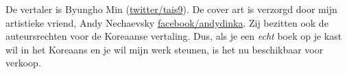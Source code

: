 \iffalse
\begin{figure}[H]
\centering
\texttt{[image: acorn\_cover.jpg]}
\end{figure}
\fi

De vertaler is Byungho Min (\href{http://go.yurichev.com/17344}{twitter/tais9}).
De cover art is verzorgd door mijn artistieke vriend, Andy Nechaevsky
\href{http://go.yurichev.com/17023}{facebook/andydinka}.
Zij bezitten ook de auteursrechten voor de Koreaanse vertaling.
Dus, als je een \emph{echt} boek op je kast wil in het Koreaans en je
wil mijn werk steunen, is het nu beschikbaar voor verkoop.


